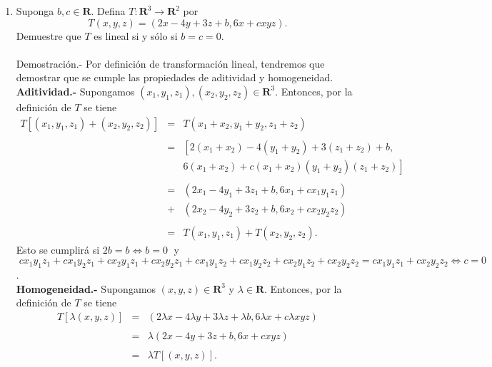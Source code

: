 \setcounter{mysection}{0}

\begin{enumerate}[\bfseries 1.]

    \item Suponga $b,c\in \textbf{R}$. Defina $T:\textbf{R}^3\to \textbf{R}^2$ por
    $$T(x,y,z)=(2x-4y+3z+b,6x+cxyz).$$
    Demuestre que $T$ es lineal si y sólo si $b=c=0$.\\\\
	Demostración.-\; Por definición de transformación lineal, tendremos que demostrar que se cumple las propiedades de aditividad y homogeneidad.\\

	\textbf{Aditividad.- } Supongamos $(x_1,y_1,z_1),(x_2,y_2,z_2)\in \textbf{R}^3$. Entonces, por la definición de $T$ se tiene
	$$
	\begin{array}{rcl}
	    T\left[(x_1,y_1,z_1)+(x_2,y_2,z_2)\right] &=& T(x_1+x_2,y_1+y_2,z_1+z_2)\\\\
						      &=& \left[2(x_1+x_2)-4(y_1+y_2)+3(z_1+z_2)+b,\right.\\
						      && \left.6(x_1+x_2)+c(x_1+x_2)(y_1+y_2)(z_1+z_2)\right]\\\\
						      &=& (2x_1-4y_1+3z_1+b,6x_1+cx_1y_1z_1)\\
						      &+&(2x_2-4y_2+3z_2+b,6x_2+cx_2y_2z_2)\\\\
						      &=& T(x_1,y_1,z_1)+T(x_2,y_2,z_2).
	\end{array}
	$$
	Esto se cumplirá si $2b=b\Leftrightarrow b=0\;$ y $\;cx_1y_1z_1+cx_1y_2z_1+cx_2y_1z_1+cx_2y_2z_1+cx_1y_1z_2+cx_1y_2z_2+cx_2y_1z_2+cx_2y_2z_2 = cx_1y_1z_1+cx_2y_2z_2 \Leftrightarrow c=0$.\\

	\textbf{Homogeneidad.- } Supongamos $(x,y,z)\in \textbf{R}^3$ y $\lambda \in \textbf{R}$. Entonces, por la definición de $T$ se tiene
	$$
	\begin{array}{rcl}
	    T\left[\lambda(x,y,z)\right] &=& (2\lambda x - 4\lambda y+3\lambda z + \lambda b, 6\lambda x + c\lambda xyz)\\\\
					 &=& \lambda(2x-4y+3z+b,6x+cxyz)\\\\
					 &=& \lambda T\left[(x,y,z)\right].
	\end{array}
	$$


\end{enumerate}
